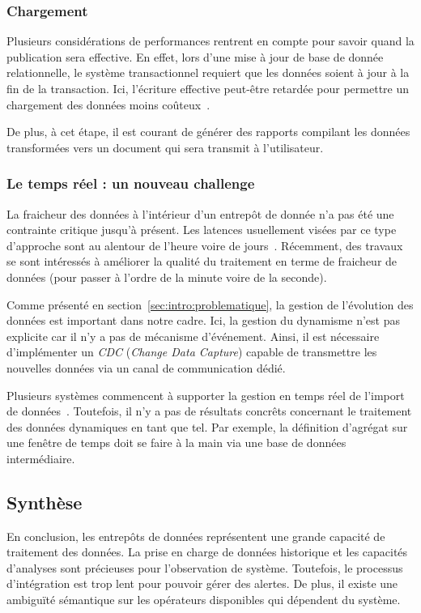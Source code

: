 \subsubsection{Chargement}
Plusieurs considérations de performances rentrent en compte pour savoir quand la publication sera effective. En effet, lors d'une mise à jour de base de donnée relationnelle, le système transactionnel requiert que les données soient à jour à la fin de la transaction. Ici, l'écriture effective peut-être retardée pour permettre un chargement des données moins coûteux~\cite{Petit:historical}.

De plus, à cet étape, il est courant de générer des rapports compilant les données transformées vers un document qui sera transmit à l'utilisateur.

\subsubsection{Le temps réel : un nouveau challenge}
La fraicheur des données à l'intérieur d'un entrepôt de donnée n'a pas été une contrainte critique jusqu'à présent. Les latences usuellement visées par ce type d'approche sont au alentour de l'heure voire de jours~\cite{Oracle:realtimedw}. Récemment, des travaux se sont intéressés à améliorer la qualité du traitement en terme de fraicheur de données (pour passer à l'ordre de la minute voire de la seconde).

Comme présenté en section~\ref{sec:intro:problematique}, la gestion de l'évolution des données est important dans notre cadre. Ici, la gestion du dynamisme n'est pas explicite car il n'y a pas de mécanisme d'événement. Ainsi, il est nécessaire d'implémenter un \textit{CDC} (\textit{Change Data Capture}) capable de transmettre les nouvelles données via un canal de communication dédié.

Plusieurs systèmes commencent à supporter la gestion en temps réel de l'import de données~\cite{Thomsen:rite, Oracle:ODI}. Toutefois, il n'y a pas de résultats concrêts concernant le traitement des données dynamiques en tant que tel. Par exemple, la définition d'agrégat sur une fenêtre de temps doit se faire à la main via une base de données intermédiaire.

\subsection{Synthèse}
En conclusion, les entrepôts de données représentent une grande capacité de traitement des données. La prise en charge de données historique et les capacités d'analyses sont précieuses pour l'observation de système. Toutefois, le processus d'intégration est trop lent pour pouvoir gérer des alertes. De plus, il existe une ambiguïté sémantique sur les opérateurs disponibles qui dépendent du système.

